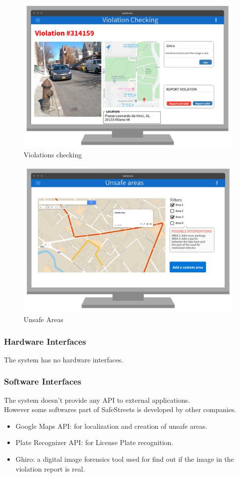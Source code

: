 \documentclass{article}
\begin{document}
\begin{figure}[H]
    \centering
    \includegraphics[scale=0.35]{Images/WEBViolationChecking}
    \caption{Violations checking}
\end{figure}
\begin{figure}[H]
    \centering
    \includegraphics[scale=0.35]{Images/WEBUnsafeAreas}
    \caption{Unsafe Areas}
\end{figure}
\newpage
\newpage
\subsubsection{Hardware Interfaces}
The system has no hardware interfaces.
\subsubsection{Software Interfaces}
The system doesn't provide any API to external applications.\\
However some softwares part of SafeStreets is developed by other companies.
\begin{itemize}
    \item Google Maps API: for localization and creation of unsafe areas.
    \item Plate Recognizer API: for License Plate recognition.
    \item Ghiro: a digital image forensics tool used for find out if the image
    in the violation report is real.
\end{itemize}
\end{document}
